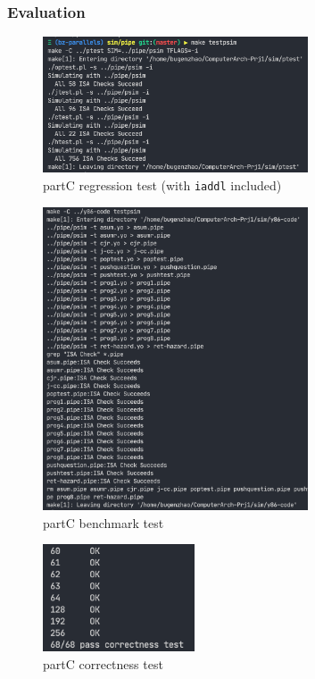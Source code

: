 \documentclass{article}
\begin{document}
\subsubsection{Evaluation}
\begin{figure}[H] %
        \centering %
        \includegraphics[width=0.7\textwidth]{partC-regression-test.png} %
        \caption{partC regression test (with \texttt{iaddl} included)} %
        \label{Fig.partC-regression} %
\end{figure}
\begin{figure}[H] %
        \centering %
        \includegraphics[width=0.7\textwidth]{partC-test2.png} %
        \caption{partC benchmark test} %
        \label{Fig.partC-benchmark} %
\end{figure}
\begin{figure}[H] %
        \centering %
        \includegraphics[width=0.4\textwidth]{partC-correctness-test.png} %
        \caption{partC correctness test} %
        \label{Fig.partC-correctness} %
\end{figure}
\end{document}
